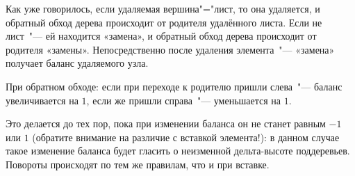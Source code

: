 Как уже говорилось, если удаляемая вершина"="лист, то она удаляется,
и обратный обход дерева происходит от родителя удалённого листа.
Если не лист "--- ей находится «замена», и обратный обход дерева происходит от родителя «замены».
Непосредственно после удаления элемента "--- «замена» получает баланс удаляемого узла.

При обратном обходе: если при переходе к родителю пришли слева "--- баланс увеличивается на $1$,
если же пришли справа "--- уменьшается на $1$.

Это делается до тех пор, пока при изменении баланса он не станет равным $-1$ или $1$
(обратите внимание на различие с вставкой элемента!):
в данном случае такое изменение баланса будет гласить о неизменной дельта-высоте поддеревьев.
Повороты происходят по тем же правилам, что и при вставке.